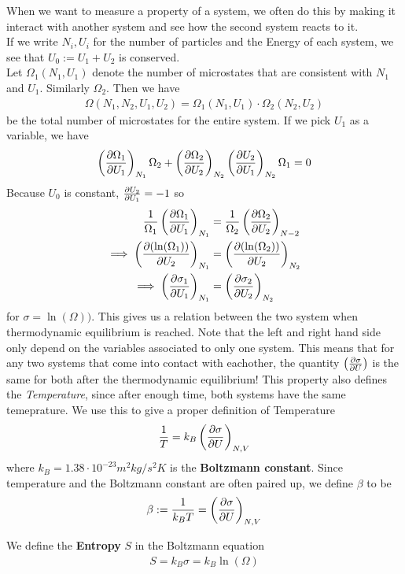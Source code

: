 When we want to measure a property of a system, we often do this by making it interact with another system and see how the second system reacts to it.\\
If we write $N_i, U_i$ for the number of particles and the Energy of each system, we see that $U_0 := U_1 + U_2$ is conserved.\\
Let $\Omega_1(N_1,U_1)$ denote the number of microstates that are consistent with $N_1$ and $U_1$. Similarly $\Omega_2$. Then we have
\begin{align*}
	\Omega(N_1,N_2,U_1,U_2) = \Omega_1(N_1,U_1) \cdot \Omega_2(N_2,U_2)
\end{align*}
be the total number of microstates for the entire system. If we pick $U_1$ as a variable, we have
\begin{align*}
	\left(\frac{\partial \Omega_1}{\partial U_1}\right)_{N_1} \Omega_2 + \left(\frac{\partial \Omega_2}{\partial U_2}\right)_{N_2} \left(\frac{\partial U_2}{\partial U_1}\right)_{N_2} \Omega_1 = 0
\end{align*}
Because $U_0$ is constant, $\frac{\partial U_2}{\partial U_1} = -1$ so
\begin{align*}
	\frac{1}{\Omega_1} \left(\frac{\partial \Omega_1}{\partial U_1}\right)_{N_1} &= \frac{1}{\Omega_2} \left(\frac{\partial \Omega_2}{\partial U_2}\right)_{N-2}\\
	\implies \left(\frac{\partial (\ln(\Omega_1))}{\partial U_2}\right)_{N_1} &= \left(\frac{\partial (\ln(\Omega_2))}{\partial U_2}\right)_{N_2}\\
	\implies \left(\frac{\partial \sigma_1}{\partial U_1}\right)_{N_1} &= \left(\frac{\partial \sigma_2}{\partial U_2}\right)_{N_2}
\end{align*}
for $\sigma = \ln(\Omega))$. This gives us a relation between the two system when thermodynamic equilibrium is reached. Note that the left and right hand side only depend on the variables associated to only one system. This means that for any two systems that come into contact with eachother, the quantity $ \left(\frac{\partial \sigma}{\partial U}\right)$ is the same for both after the thermodynamic equilibrium! This property also defines the \emph{Temperature}, since after enough time, both systems have the same temeprature. We use this to give a proper definition of Temperature
\begin{align*}
	\frac{1}{T} = k_B \left(\frac{\partial \sigma}{\partial U}\right)_{N,V}
\end{align*}
where $k_B = 1.38 \cdot 10^{-23}m^2 kg/s^2K$ is the \textbf{Boltzmann constant}. Since temperature and the Boltzmann constant are often paired up, we define $\beta$ to be
\begin{align*}
	\beta :=\frac{1}{k_BT} = \left(\frac{\partial \sigma}{\partial U}\right)_{N,V}
\end{align*}

We define the \textbf{Entropy} $S$ in the Boltzmann equation
\begin{align*}
	S = k_B \sigma = k_B \ln(\Omega)
\end{align*}
